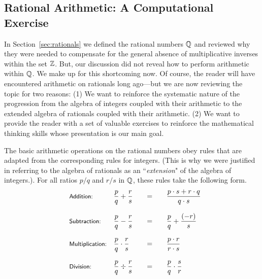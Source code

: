 \subsection{Rational Arithmetic: A Computational Exercise}
\label{sec:Rational-arithmetic}

In Section~\ref{sec:rationals} we defined the rational numbers $\mathbb{Q}$ and reviewed why they were needed to compensate for the general absence of multiplicative inverses within the set $\mathbb{Z}$.  But, our discussion did not reveal how to perform arithmetic within $\mathbb{Q}$.  We make up for this shortcoming now.  Of course, the reader will have encountered arithmetic on rationals long ago---but we are now reviewing the topic for two reasons:  (1) We want to reinforce the systematic nature of the progression from the algebra of integers coupled with their arithmetic to the extended algebra of rationals coupled with their arithmetic.  (2) We want to provide the reader with a set of valuable exercises to reinforce the mathematical thinking skills whose presentation is our main goal.

\medskip

The basic arithmetic operations on the rational numbers obey rules that are adapted from the corresponding rules for integers.  (This is why we were justified in referring to the algebra of rationals as an ``{\em extension}" of the algebra of integers.). For all ratios $p/q$ and $r/s$ in $\mathbb{Q}$, these rules take the following form.
\[
\begin{array}{llcccl}
\mbox{\small\sf Addition:} & 
{\displaystyle
{p \over q} + {r \over s} }
  & & = & &
{\displaystyle
 \frac{p \cdot s + r \cdot q}{q \cdot s} }  \\
 & & & & & \\
\mbox{\small\sf Subtraction:} &
{\displaystyle
{p \over q} - {r \over s} }
  & & = & &
{\displaystyle
{p \over q} + {(-r) \over s} } \\
 & & & & & \\
\mbox{\small\sf Multiplication:} &
{\displaystyle
{p \over q} \cdot {r \over s} }
  & & = & &
{\displaystyle
\frac{p \cdot r}{r \cdot s} } \\
  & & & & & \\
\mbox{\small\sf Division:} &
{\displaystyle
{p \over q} \div {r \over s} }
  & & = & &
{\displaystyle
{p \over q} \cdot {s \over r} }
\end{array}
\]

\smallskip


